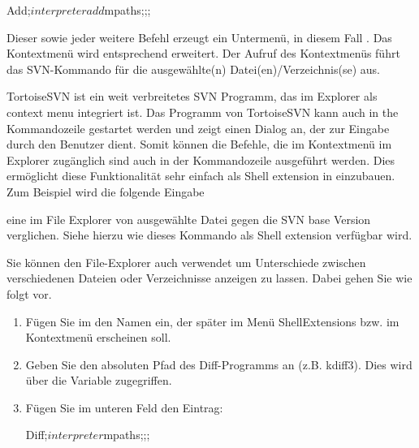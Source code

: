 \begin{code}
 Add;$interpreter add $mpaths;;;
\end{code}

Dieser sowie jeder weitere Befehl erzeugt ein Untermenü, in diesem Fall . Das Kontextmenü wird entsprechend erweitert. Der Aufruf des Kontextmenüs führt das SVN-Kommando  für die ausgewählte(n) Datei(en)/Verzeichnis(se) aus.

TortoiseSVN ist ein weit verbreitetes SVN Programm, das im Explorer als context menu integriert ist. Das Programm  von TortoiseSVN kann auch in the Kommandozeile gestartet werden und zeigt einen Dialog an, der zur Eingabe durch den Benutzer dient. Somit können die Befehle, die im Kontextmenü im Explorer zugänglich sind auch in der Kommandozeile ausgeführt werden. Dies ermöglicht diese Funktionalität sehr einfach als Shell extension in \codeblocks einzubauen. Zum Beispiel wird die folgende Eingabe


eine im File Explorer von \codeblocks ausgewählte Datei gegen die SVN base Version verglichen. Siehe hierzu  wie dieses Kommando als Shell extension verfügbar wird.




Sie können den File-Explorer auch verwendet um Unterschiede zwischen verschiedenen Dateien oder Verzeichnisse anzeigen zu lassen. Dabei gehen Sie wie folgt vor.

\begin{enumerate}
\item Fügen Sie im  den Namen ein, der später im Menü ShellExtensions bzw. im Kontextmenü erscheinen soll.
\item Geben Sie den absoluten Pfad des Diff-Programms an (z.B. kdiff3). Dies wird über die Variable  zugegriffen.
\item Fügen Sie im unteren Feld den Eintrag:
\begin{cmd}
Diff;$interpreter $mpaths;;;
\end{cmd}
\end{enumerate}

